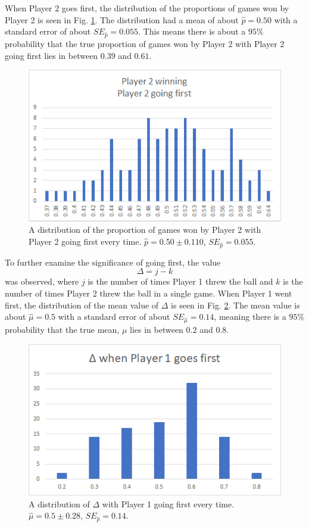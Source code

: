 \documentclass{article}
\begin{document}
When Player 2 goes first, the distribution of the proportions of games won by Player 2 is seen in Fig. \ref{2wins2goesfirst}. The distribution had a mean of about $\hat{p} = 0.50$ with a standard error of about $SE_{\hat{p}} = 0.055$. This means there is about a $95\%$ probability that the true proportion of games won by Player 2 with Player 2 going first lies in between $0.39$ and $0.61$.
\begin{figure}
	\centering
	\includegraphics[width=0.7\linewidth]{2wins2goesfirst}
	\caption{A distribution of the proportion of games won by Player 2 with Player 2 going first every time. $\hat{p} = 0.50 \pm 0.110$, $SE_{\hat{p}} = 0.055$.}
	\label{2wins2goesfirst}
\end{figure}

To further examine the significance of going first, the value
\begin{equation}\label{delta}
\Delta = j - k
\end{equation}
was observed, where $j$ is the number of times Player 1 threw the ball and $k$ is the number of times Player 2 threw the ball in a single game. When Player 1 went first, the distribution of the mean value of $\Delta$ is seen in Fig. \ref{delta1goesfirst}. The mean value is about $\hat{\mu} = 0.5$ with a standard error of about $SE_{\hat{\mu}} = 0.14$, meaning there is a $95\%$ probability that the true mean, $\mu$ lies in between $0.2$ and $0.8$.

\begin{figure}
	\centering
	\includegraphics[width=0.7\linewidth]{delta1goesfirst}
	\caption{A distribution of $\Delta$ with Player 1 going first every time. $\hat{\mu} = 0.5 \pm 0.28$, $SE_{\hat{p}} = 0.14$.}
	\label{delta1goesfirst}
\end{figure}
\end{document}
